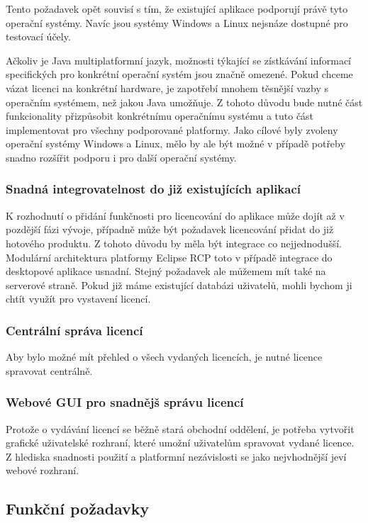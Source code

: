 Tento požadavek opět souvisí s tím, že existující aplikace podporují právě tyto
operační systémy. Navíc jsou systémy Windows a Linux nejsnáze dostupné pro
testovací účely. 

Ačkoliv je Java multiplatformní jazyk, možnosti týkající se zístkávání informací
specifických pro konkrétní operační systém jsou značně omezené. Pokud chceme
vázat licenci na konkrétní hardware, je zapotřebí mnohem těsnější vazby s
operačním systémem, než jakou Java umožňuje. Z tohoto důvodu bude nutné část
funkcionality přizpůsobit konkrétnímu operačnímu systému a tuto část
implementovat pro všechny podporované platformy. Jako cílové byly zvoleny
operační systémy Windows a Linux, mělo by ale být možné v případě potřeby snadno
rozšířit podporu i pro další operační systémy.


\subsubsection*{Snadná integrovatelnost do již existujících aplikací}
 
K rozhodnutí o přidání funkčnosti pro licencování do aplikace může dojít až v
pozdější fázi vývoje, případně může být požadavek licencování přidat do již
hotového produktu. Z tohoto důvodu by měla být integrace co nejjednodušší.
Modulární architektura platformy Eclipse RCP toto v případě integrace do
desktopové aplikace usnadní. Stejný požadavek ale můžemem mít také na serverové
straně. Pokud již máme existující databázi uživatelů, mohli bychom ji chtít
využít pro vystavení licencí.
  
\subsubsection*{Centrální správa licencí}

Aby bylo možné mít přehled o všech vydaných licencích, je nutné licence
spravovat centrálně.

\subsubsection*{Webové GUI pro snadnějš správu licencí}

Protože o vydávání licencí se běžně stará obchodní oddělení, je potřeba
vytvořit grafické uživatelské rozhraní, které umožní uživatelům spravovat vydané
licence. Z hlediska snadnosti použití a platformní nezávislosti se jako
nejvhodnější jeví webové rozhraní.


\subsection{Funkční požadavky}

